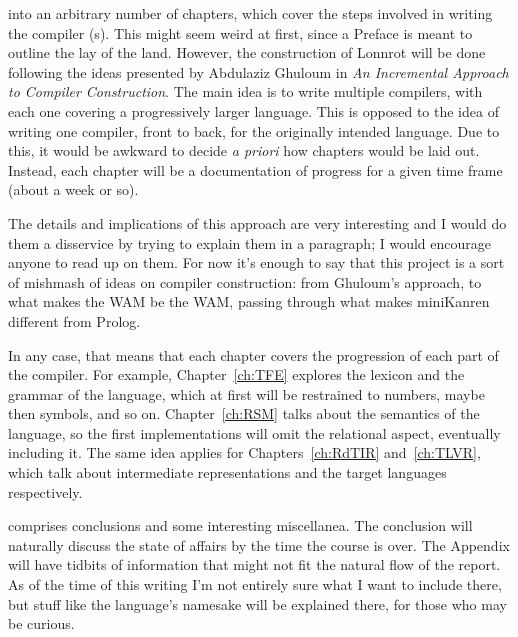  into an arbitrary number of chapters, which cover the steps
involved in writing the compiler (s). This might seem weird at first, since a Preface is meant to outline
the lay of the land. However, the construction of Lonnrot will be done following the ideas presented
by Abdulaziz Ghuloum in \textit{An Incremental Approach to Compiler Construction}.
The main idea is to write multiple compilers, with each one covering a progressively larger language.
This is opposed to the idea of writing one compiler, front to back, for the originally intended
language. Due to this, it would be awkward to decide \textit{a priori} how chapters would be laid out.
Instead, each chapter will be a documentation of progress for a given time frame (about a week or so).

The details and implications of this approach are very interesting and I would
do them a disservice by trying to explain them in a paragraph; I would encourage anyone
to read up on them. For now it's enough to say that this project is a sort of mishmash of ideas
on compiler construction: from Ghuloum's approach, to what makes the WAM be the WAM, passing
through what makes miniKanren different from Prolog.

In any case, that means that each chapter covers the progression of each part of the compiler.
For example, Chapter~\ref{ch:TFE} explores the lexicon and the grammar of the language, which
at first will be restrained to numbers, maybe then symbols, and so on. Chapter~\ref{ch:RSM} talks
about the semantics of the language, so the first implementations will omit the relational aspect,
eventually including it. The same idea applies for Chapters~\ref{ch:RdTIR} and~\ref{ch:TLVR}, which
talk about intermediate representations and the target languages respectively.

 comprises conclusions and some interesting
miscellanea. The conclusion will naturally discuss the state of affairs by the time the course is over.
The Appendix will have tidbits of information that might not fit the natural flow of the report.
As of the time of this writing I'm not entirely sure what I want to include there, but
stuff like the language's namesake will be explained there, for those who may be curious.
